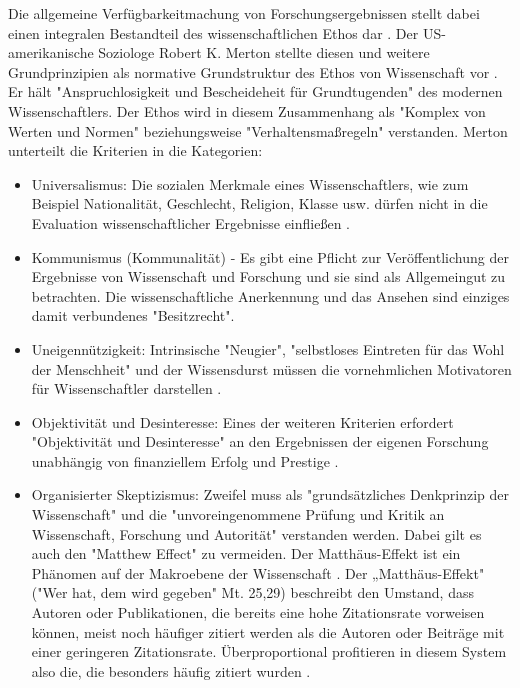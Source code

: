 Die allgemeine Verfügbarkeitmachung von Forschungsergebnissen stellt dabei einen integralen Bestandteil des wissenschaftlichen Ethos dar \cite{Fangerau_2014}. Der US-amerikanische Soziologe Robert K. Merton stellte diesen und weitere Grundprinzipien als normative Grundstruktur des Ethos von Wissenschaft vor \cite{Merton_1985}. Er hält "Anspruchlosigkeit und Bescheideheit für Grundtugenden" \cite{hagner_2015_sache_buches} des modernen Wissenschaftlers. Der Ethos wird in diesem Zusammenhang als "Komplex von Werten und Normen"\cite{suchen} beziehungsweise "Verhaltensmaßregeln"\cite{suchen} verstanden. Merton unterteilt die Kriterien in die Kategorien:
\begin{itemize}
\item Universalismus: Die sozialen Merkmale eines Wissenschaftlers, wie zum Beispiel Nationalität, Geschlecht, Religion, Klasse usw. dürfen nicht in die Evaluation wissenschaftlicher Ergebnisse einfließen \cite{suchen}.
\item Kommunismus (Kommunalität) - Es gibt eine Pflicht zur Veröffentlichung der Ergebnisse von Wissenschaft und Forschung und sie sind als Allgemeingut zu betrachten. Die wissenschaftliche Anerkennung und das Ansehen sind einziges damit verbundenes "Besitzrecht"\cite{suchen}.
\item Uneigennützigkeit: Intrinsische "Neugier"\cite{suchen}, "selbstloses Eintreten für das Wohl der Menschheit"\cite{suchen} und der Wissensdurst müssen die vornehmlichen Motivatoren für Wissenschaftler darstellen \cite{suchen}.
\item Objektivität und Desinteresse: Eines der weiteren Kriterien erfordert "Objektivität und Desinteresse" an den Ergebnissen der eigenen Forschung \cite{suchen} unabhängig von finanziellem Erfolg und Prestige \cite{suchen}.
\item Organisierter Skeptizismus: Zweifel muss als "grundsätzliches Denkprinzip der Wissenschaft" \cite{suchen} und die "unvoreingenommene Prüfung und Kritik an Wissenschaft, Forschung und Autorität" \cite{suchen} verstanden werden. Dabei gilt es auch den "Matthew Effect" zu vermeiden. Der Matthäus-Effekt ist ein Phänomen auf der Makroebene der Wissenschaft \cite{bonitz_1998_matthaus}. Der „Matthäus-Effekt" ("Wer hat, dem wird gegeben" Mt. 25,29) beschreibt den Umstand, dass Autoren oder Publikationen, die bereits eine hohe Zitationsrate vorweisen können, meist noch häufiger zitiert werden als die Autoren oder Beiträge mit einer geringeren Zitationsrate. Überproportional profitieren in diesem System also die, die besonders häufig zitiert wurden \cite{Merton_1968} \cite{meier_2009_matthaus}.
\end{itemize}

